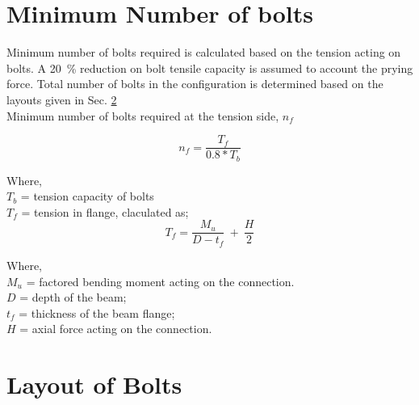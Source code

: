 \documentclass[11.5pt,a4paper,oneside]{report}
\begin{document}
\begin{Form}
\section{Minimum Number of bolts}
Minimum number of bolts required is calculated based on the tension acting on bolts. A 20~\% reduction on bolt tensile capacity is assumed to account the prying force. Total number of bolts in the configuration is determined based on the layouts given in Sec. \ref{layout} \\
Minimum number of bolts required at the tension side, $n_f$

\begin{equation}
	n_f = \frac{T_f}{0.8 * T_b}
\end{equation}

Where, \\
\indent $T_b$ = tension capacity of bolts \\
\indent $T_f$ = tension in flange, claculated as; \\

\begin{equation}
	T_{f} = \frac{M_u}{D - t_f} ~ + ~ \frac{H}{2}
\end{equation}

Where, \\
\indent $M_u$ = factored bending moment acting on the connection. \\
\indent $D$ = depth of the beam; \\
\indent $t_f$ = thickness of the beam flange; \\
\indent $H$ = axial force acting on the connection. \\


\section{Layout of Bolts}
\label{layout}

\end{Form}
\end{document}
